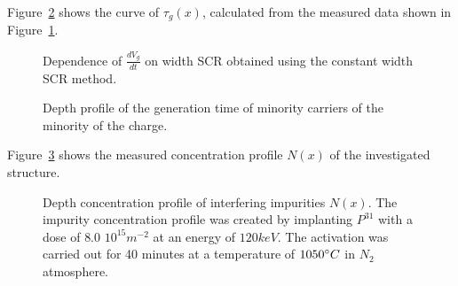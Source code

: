 Figure~\ref{fig:3.6} shows the curve of $\tau_g(x)$, calculated
from the measured data shown in Figure~\ref{fig:3.5}.

\begin{figure}[h!]\centering
  
  \caption[Dependence of $\frac{dV_g}{dt}$ on SCR width obtained by
    constant SCR width method]{Dependence of $\frac{dV_g}{dt}$ on width
    SCR obtained using the constant width SCR method.}\label{fig:3.5}
\end{figure}

\begin{figure}[h!]\centering
  
  \caption[Depth profile of the generation lifetime of minority carriers
    charge]{Depth profile of the generation time of minority carriers
    of the minority of the charge.}\label{fig:3.6}
\end{figure}

Figure~\ref{fig:3.7} shows the measured concentration profile $N(x)$ of the investigated
structure.

\begin{figure}[h!]\centering
  
  \caption[Depth profile of concentration of interfering impurities
    $N(x)$]{Depth concentration profile of interfering impurities
    $N(x)$. The impurity concentration profile was created by implanting
    $P^{31}$ with a dose of $8.0$ $10^{15}m^{-2}$ at an energy of $120 keV$.
    The activation was carried out for 40 minutes at a temperature of $1050 \degree C$ in
    $N_2$ atmosphere.}\label{fig:3.7}
\end{figure}


